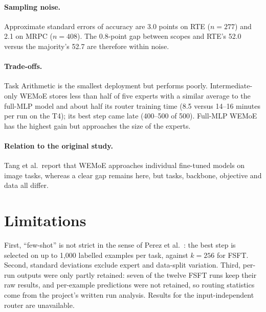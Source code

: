 \paragraph{Sampling noise.} Approximate standard errors of accuracy are 3.0 points on RTE ($n=277$) and 2.1 on MRPC ($n=408$). The 0.8-point gap between scopes and RTE's 52.0 versus the majority's 52.7 are therefore within noise.

\paragraph{Trade-offs.} Task Arithmetic is the smallest deployment but performs poorly. Intermediate-only WEMoE stores less than half of five experts with a similar average to the full-MLP model and about half its router training time (8.5 versus 14--16 minutes per run on the T4); its best step came late (400--500 of 500). Full-MLP WEMoE has the highest gain but approaches the size of the experts.

\paragraph{Relation to the original study.} Tang et al.\ report that WEMoE approaches individual fine-tuned models on image tasks, whereas a clear gap remains here, but tasks, backbone, objective and data all differ.

\section{Limitations}
\label{sec:limitations}

First, ``few-shot'' is not strict in the sense of Perez et al.~\cite{perez2021truefewshot}: the best step is selected on up to 1,000 labelled examples per task, against $k=256$ for FSFT. Second, standard deviations exclude expert and data-split variation. Third, per-run outputs were only partly retained: seven of the twelve FSFT runs keep their raw results, and per-example predictions were not retained, so routing statistics come from the project's written run analysis. Results for the input-independent router are unavailable.